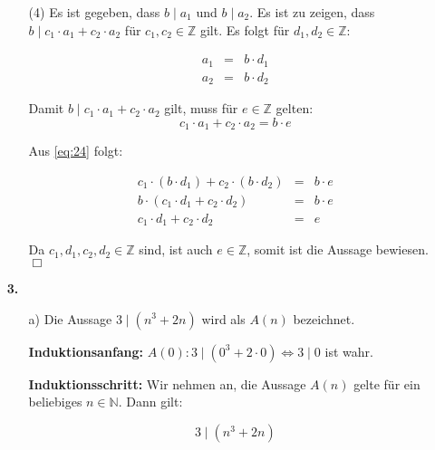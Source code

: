 \documentclass[a4paper,10pt]{scrartcl}
\begin{document}
\begin{enumerate}
\begin{enumerate}
            \item[(4)]
                Es ist gegeben, dass $b \mid a_1$ und $b \mid a_2$. Es ist zu zeigen, dass $b \mid c_1 \cdot a_1
                + c_2 \cdot a_2$ für $c_1, c_2 \in \mathbb{Z}$ gilt. Es folgt für $d_1, d_2 \in \mathbb{Z}$:

                \begin{equation}\label{eq:24}\begin{array}{rcl}
                    a_1 &=& b \cdot d_1\\
                    a_2 &=& b \cdot d_2
                \end{array}\end{equation}

                Damit $b \mid c_1 \cdot a_1 + c_2 \cdot a_2$ gilt, muss für $e \in \mathbb{Z}$ gelten:
                $$c_1 \cdot a_1 + c_2 \cdot a_2 = b \cdot e$$

                Aus \eqref{eq:24} folgt:

                $$\begin{array}{rcl}
                    c_1 \cdot (b \cdot d_1) + c_2 \cdot (b \cdot d_2) &=& b \cdot e\\
                    b \cdot (c_1 \cdot d_1 + c_2 \cdot d_2) &=& b \cdot e\\
                    c_1 \cdot d_1 + c_2 \cdot d_2 &=& e
                \end{array}$$

                Da $c_1, d_1, c_2, d_2 \in \mathbb{Z}$ sind, ist auch $e \in \mathbb{Z}$, somit ist die Aussage bewiesen. $\Box$
        \end{enumerate}

    \item[\textbf{3.}]
        \begin{enumerate}
            \item[a)]
                Die Aussage $3 \mid (n^3 + 2n)$ wird als $A(n)$ bezeichnet.

                \textbf{Induktionsanfang:} $A(0): 3 \mid (0^3 + 2 \cdot 0) \Leftrightarrow 3 \mid 0$ ist wahr.

                \textbf{Induktionsschritt:} Wir nehmen an, die Aussage $A(n)$ gelte für ein beliebiges
                $n \in \mathbb{N}$. Dann gilt:

                \begin{equation}\label{eq:3aIA}\tag{IA}
                    3 \mid (n^3 + 2n)
                \end{equation}


\end{enumerate}
\end{enumerate}
\end{document}

